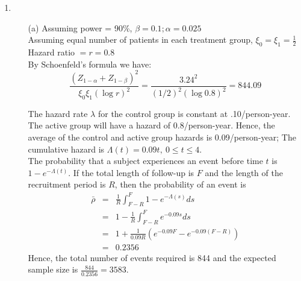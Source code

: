 \documentclass[11pt,a4paper]{article}
\begin{document}
\begin{enumerate}
\item
\begin{enumerate}
\item[(a)] 
Assuming power = 90\%, $\beta = 0.1; \alpha = 0.025$ \\
Assuming equal number of patients in each treatment group, $\xi_0=\xi_1=\frac{1}{2}$ \\
Hazard ratio $= r = 0.8$ \\
By Schoenfeld’s formula we have:
\[ \dfrac{(Z_{1-\alpha}+Z_{1-\beta})^ 2}{\xi_0\xi_1(\log r)^2} = \dfrac{3.24^ 2}{(1/2)^2(\log 0.8)^2} = 844.09 \]

The hazard rate $\lambda$ for the control group is constant at .10/person-year. The active group will have a hazard of 0.8/person-year. Hence, the average of the control and active group hazards is 0.09/person-year; The cumulative hazard is $\Lambda(t) = 0.09t, \ 0 \leq t \leq 4$. \\
The probability that a subject experiences an event before time $t$ is $1 - e^{-\Lambda(t)}$. If the total length of follow-up is $F$ and the length of the recruitment period is $R$, then the probability of an event is
\begin{eqnarray*}
\bar{\rho} &=& \frac{1}{R} \int_{F - R}^{F} 1 - e^{-\Lambda(s)}ds \\
           &=& 1 - \frac{1}{R} \int_{F - R}^{F} e^{-0.09s} ds \\
           &=& 1 + \frac{1}{0.09R}\left(e^{-0.09F} - e^{-0.09(F - R)} \right) \\
           &=& 0.2356
\end{eqnarray*}
Hence, the total number of events required is 844 and the expected sample size is $\frac{844}{0.2356} = 3583$. 



\end{enumerate}
\end{enumerate}
\end{document}

